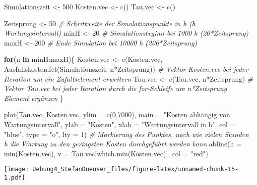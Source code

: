 \documentclass[
]{article}
\newenvironment{Shaded}{\begin{snugshade}}{\end{snugshade}}
\newcommand{\AttributeTok}[1]{\textcolor[rgb]{0.77,0.63,0.00}{#1}}
\newcommand{\CommentTok}[1]{\textcolor[rgb]{0.56,0.35,0.01}{\textit{#1}}}
\newcommand{\ControlFlowTok}[1]{\textcolor[rgb]{0.13,0.29,0.53}{\textbf{#1}}}
\newcommand{\DecValTok}[1]{\textcolor[rgb]{0.00,0.00,0.81}{#1}}
\newcommand{\FunctionTok}[1]{\textcolor[rgb]{0.00,0.00,0.00}{#1}}
\newcommand{\NormalTok}[1]{#1}
\newcommand{\OtherTok}[1]{\textcolor[rgb]{0.56,0.35,0.01}{#1}}
\newcommand{\SpecialCharTok}[1]{\textcolor[rgb]{0.00,0.00,0.00}{#1}}
\newcommand{\StringTok}[1]{\textcolor[rgb]{0.31,0.60,0.02}{#1}}
\begin{document}
\begin{Shaded}
\begin{Highlighting}[]
\NormalTok{Simulationszeit }\OtherTok{\textless{}{-}} \DecValTok{500}
\NormalTok{Kosten.vec }\OtherTok{\textless{}{-}} \FunctionTok{c}\NormalTok{()}
\NormalTok{Tau.vec }\OtherTok{\textless{}{-}} \FunctionTok{c}\NormalTok{()}

\NormalTok{Zeitsprung }\OtherTok{\textless{}{-}} \DecValTok{50}    \CommentTok{\# Schrittweite der Simulationspunkte in h (h Wartungsintervall)}
\NormalTok{minH }\OtherTok{\textless{}{-}} \DecValTok{20}          \CommentTok{\# Simulationsbeginn bei 1000 h (20*Zeitsprung)}
\NormalTok{maxH }\OtherTok{\textless{}{-}} \DecValTok{200}         \CommentTok{\# Ende Simulation bei 10000 h (200*Zeitsprung)}


\ControlFlowTok{for}\NormalTok{(n }\ControlFlowTok{in}\NormalTok{ minH}\SpecialCharTok{:}\NormalTok{maxH)\{}
\NormalTok{  Kosten.vec }\OtherTok{\textless{}{-}} \FunctionTok{c}\NormalTok{(Kosten.vec, }\FunctionTok{Ausfallskosten.fct}\NormalTok{(Simulationszeit, n}\SpecialCharTok{*}\NormalTok{Zeitsprung))  }\CommentTok{\# Vektor Kosten.vec bei jeder Iteration um ein Zufallselement erweitern}
\NormalTok{  Tau.vec }\OtherTok{\textless{}{-}} \FunctionTok{c}\NormalTok{(Tau.vec, n}\SpecialCharTok{*}\NormalTok{Zeitsprung)     }\CommentTok{\# Vektor Tau.vec bei jeder Iteration durch die for{-}Schleife um n*Zeitsprung Element ergänzen}
\NormalTok{\}}

\FunctionTok{plot}\NormalTok{(Tau.vec, Kosten.vec, }\AttributeTok{ylim =} \FunctionTok{c}\NormalTok{(}\DecValTok{0}\NormalTok{,}\DecValTok{7000}\NormalTok{), }\AttributeTok{main =} \StringTok{"Kosten abhängig von Wartungsintervall"}\NormalTok{, }\AttributeTok{ylab =} \StringTok{"Kosten"}\NormalTok{, }\AttributeTok{xlab =} \StringTok{"Wartungsintervall in h"}\NormalTok{, }\AttributeTok{col =} \StringTok{"blue"}\NormalTok{, }\AttributeTok{type =} \StringTok{"o"}\NormalTok{, }\AttributeTok{lty =} \DecValTok{1}\NormalTok{)}
\CommentTok{\# Markierung des Punktes, nach wie vielen Stunden h die Wartung zu den geringsten Kosten durchgeführt werden kann}
\FunctionTok{abline}\NormalTok{(}\AttributeTok{h =} \FunctionTok{min}\NormalTok{(Kosten.vec), }\AttributeTok{v =}\NormalTok{ Tau.vec[}\FunctionTok{which.min}\NormalTok{(Kosten.vec)], }\AttributeTok{col =} \StringTok{"red"}\NormalTok{)}
\end{Highlighting}
\end{Shaded}

\texttt{[image: Uebung4\_StefanDuenser\_files/figure-latex/unnamed-chunk-15-1.pdf]}
\end{document}
